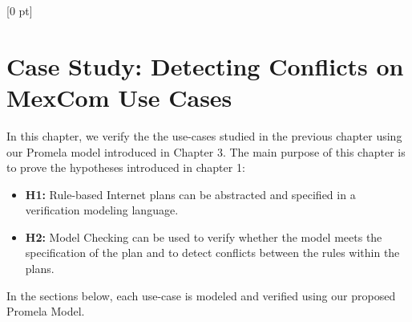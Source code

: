\titlespacing{\chapter}{0 pt}{30 pt}{50 pt}[0 pt]
\titleformat{\section}{\Large\bfseries}{\thesection}{0 pt}{\hspace{30 pt}}
\titleformat{\subsection}{\large\bfseries}{\thesubsection}{0 pt}{\hspace{30 pt}}
\pagestyle{fancy}
\fancyhead[LO,LE]{\footnotesize\emph{\leftmark}}
\fancyhead[RO,RE]{\thepage}
\fancyfoot[CO,CE]{}

\chapter{Case Study: Detecting Conflicts on MexCom Use Cases} %

\normalsize
\noindent
In this chapter, we verify the the use-cases studied in the previous chapter using our Promela model introduced in Chapter 3. The main purpose of this chapter is to prove the hypotheses introduced in chapter 1: \\
\begin{itemize}
\item \textbf{H1:} Rule-based Internet plans can be abstracted and specified in  a verification modeling language. 

\item \textbf{H2:} Model Checking can be used to verify whether the model meets the specification of the plan and to detect conflicts between the rules within the plans. 
\end{itemize}

In the sections below, each use-case is modeled and verified using our proposed Promela Model. 

